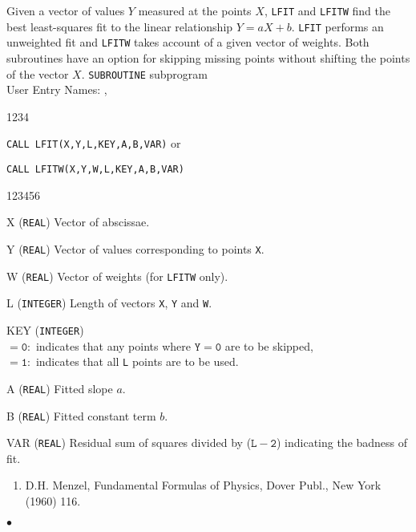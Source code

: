                         
                     
 \Submitter{}                           
                
Given a vector of values $Y$ measured at the points $X$, {\tt LFIT}
and {\tt LFITW} find the best least-squares fit to the linear
relationship $Y=aX+b$. {\tt LFIT} performs an unweighted fit and
{\tt LFITW} takes account of a given vector of weights.
Both subroutines have an option for skipping missing
points without shifting the points of the vector $X$.
\Structure
{\tt SUBROUTINE} subprogram\\
User Entry Names: , 
\Usage
\begin{DLtt}{1234}
\item[] {\tt CALL LFIT(X,Y,L,KEY,A,B,VAR)} \qquad or
\item[] {\tt CALL LFITW(X,Y,W,L,KEY,A,B,VAR)}
\end{DLtt}
\begin{DLtt}{123456}
\item[X] ({\tt REAL}) Vector of abscissae.
\item[Y] ({\tt REAL}) Vector of values corresponding to points {\tt X}.
\item[W] ({\tt REAL}) Vector of weights (for {\tt LFITW} only).
\item[L] ({\tt INTEGER}) Length of vectors {\tt X}, {\tt Y} and {\tt W}.
\item[KEY] ({\tt INTEGER}) \\
$\mathtt{= 0:}$ indicates that any points where $\mathtt{Y=0}$ are to be
skipped, \\
$\mathtt{= 1:}$ indicates that all {\tt L} points are to be used.
\item[A] ({\tt REAL}) Fitted slope $a$.
\item[B] ({\tt REAL}) Fitted constant term $b$.
\item[VAR] ({\tt REAL}) Residual sum of squares divided by
($\mathtt{L-2}$) indicating the badness of fit.
\end{DLtt}
\Refer
\begin{enumerate}
\item D.H. Menzel, Fundamental Formulas of Physics, Dover Publ., New York
(1960) 116.
\end{enumerate}
$\bullet$

